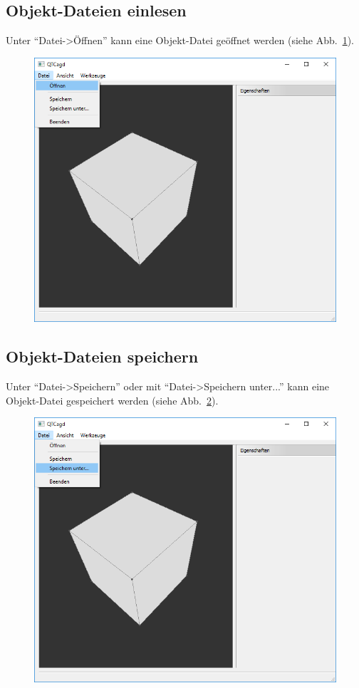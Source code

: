 \subsection{Objekt-Dateien einlesen}
Unter "`Datei->Öffnen"' kann eine Objekt-Datei geöffnet werden (siehe Abb.~\ref{fig:DateiOeffnen}).

\begin{figure}[H]
\centering
\includegraphics[scale=0.5]{content/pictures/0-DateiOeffnen}
\caption{}
\label{fig:DateiOeffnen}
\end{figure}

\subsection{Objekt-Dateien speichern}
Unter "`Datei->Speichern"' oder mit "`Datei->Speichern unter..."' kann eine Objekt-Datei gespeichert werden (siehe Abb.~\ref{fig:DateiSpeichern}).

\begin{figure}[H]
	\centering
	\includegraphics[scale=0.5]{content/pictures/1-DateiSpeichern}
	\caption{}
	\label{fig:DateiSpeichern}
\end{figure}

